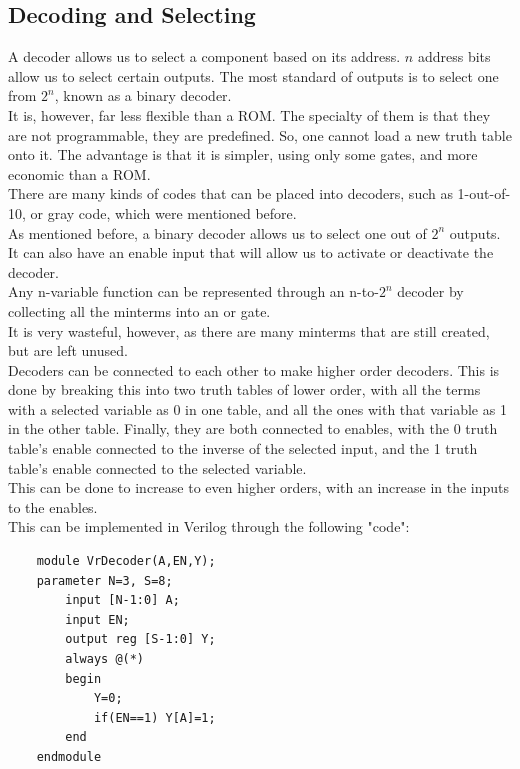\documentclass[nobib]{tufte-handout}
\begin{document}
    \subsection{Decoding and Selecting}
    A decoder allows us to select a component based on its address. $n$ address
    bits allow us to select certain outputs. The most standard of outputs is to
    select one from $2^n$, known as a binary decoder.\\ It is, however, far less
    flexible than a ROM. The specialty of them is that they are not programmable,
    they are predefined. So, one cannot load a new truth table onto it. The
    advantage is that it is simpler, using only some gates, and more economic than
    a ROM.\\ There are many kinds of codes that can be placed into decoders, such
    as 1-out-of-10, or gray code, which were mentioned before.\\ As mentioned
    before, a binary decoder allows us to select one out of $2^n$ outputs. It can
    also have an enable input that will allow us to activate or deactivate the
    decoder.\\ Any n-variable function can be represented through an n-to-$2^n$
    decoder by collecting all the minterms into an or gate.\\ It is very wasteful,
    however, as there are many minterms that are still created, but are left
    unused.\\ Decoders can be connected to each other to make higher order
    decoders. This is done by breaking this into two truth tables of lower order,
    with all the terms with a selected variable as 0 in one table, and all the ones
    with that variable as 1 in the other table. Finally, they are both connected to
    enables, with the 0 truth table's enable connected to the inverse of the
    selected input, and the 1 truth table's enable connected to the selected
    variable.\\ This can be done to increase to even higher orders, with an
    increase in the inputs to the enables.\\ This can be implemented in Verilog
    through the following "code":
    \begin{lstlisting}
    module VrDecoder(A,EN,Y);
    parameter N=3, S=8;
        input [N-1:0] A;
        input EN;
        output reg [S-1:0] Y;
        always @(*)
        begin
            Y=0;
            if(EN==1) Y[A]=1;
        end
    endmodule
\end{lstlisting}
\end{document}
